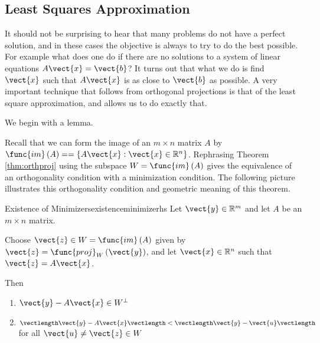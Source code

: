 \subsection{Least Squares Approximation}

It should not be surprising to hear that many problems do not have a
perfect solution, and in these cases the objective is always to try to
do the best possible. For example what does one do if there are no
solutions to a system of linear equations $A\vect{x}=\vect{b}$? It
turns out that what we do is find $\vect{x}$ such that $A\vect{x}$ is
as close to $\vect{b}$ as possible. A very important technique that
follows from orthogonal projections is that of the least square
 approximation, and allows us to do
exactly that.

We begin with a lemma. 

Recall that we can form the image of an $m \times n$ matrix $A$ by
$\func{im}\left( A\right) = = \left\{ A\vect{x} : \vect{x} \in
\mathbb{R}^n \right\}$. Rephrasing Theorem \ref{thm:orthproj} using
the subspace $W=\func{im}\left( A\right)$  gives the
equivalence of an orthogonality condition with a minimization
condition. The following picture
illustrates this orthogonality condition and geometric meaning of this
theorem.

\begin{center}
\end{center}

\begin{theorem}{Existence of Minimizers}{existenceminimizerhs}\label{existenceminimizerhs}
Let $\vect{y}\in \mathbb{R}^{m}$ and let $A$ be an $m\times n$ matrix.

Choose $\vect{z}\in W= \func{im}\left( A\right)$ given by $\vect{z} =
\func{proj}_{W}\left( \vect{y}\right)$, and let $\vect{x} \in \mathbb{R}^{n}$ such that $\vect{z}=A\vect{x}$.

Then
\begin{enumerate}
\item $\vect{y} - A\vect{x} \in W^{\perp}$
\item $\vectlength \vect{y} - A\vect{x} \vectlength < \vectlength \vect{y} - \vect{u} \vectlength$ for all $\vect{u} \neq \vect{z} \in W$
\end{enumerate}
\end{theorem}

